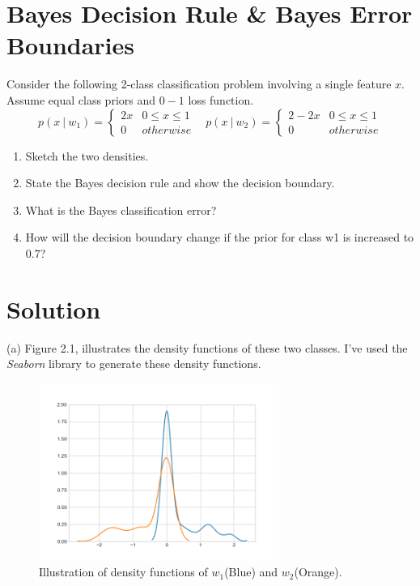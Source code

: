 \documentclass[12pt]{article}
\numberwithin{equation}{section}
\numberwithin{table}{section}
\numberwithin{figure}{section}
\begin{document}
\section{Bayes Decision Rule \& Bayes Error Boundaries}
Consider the following 2-class classification problem involving a single feature $x$. Assume equal class priors and $0-1$ loss function.
$$
p(x\ |\ w_1) = \begin{cases} 
2x &  0 \leq x \leq 1\\
0       &  otherwise
\end{cases} \ \ \ \ p(x\ |\ w_2) = \begin{cases} 
2-2x &  0 \leq x \leq 1\\
0       &  otherwise
\end{cases}
$$	
\begin{enumerate}[label=(\alph*)]
	\item Sketch the two densities.
	
	\item State the Bayes decision rule and show the decision boundary.
	
	\item What is the Bayes classification error?
	
	\item How will the decision boundary change if the prior for class w1 is increased to 0.7? 
\end{enumerate}
\section*{Solution}
(a) Figure 2.1, illustrates the density functions of these two classes. I've used the \textit{Seaborn} library to generate these density functions.
\begin{figure}[!h]\centering
	\includegraphics[width=0.7\textwidth]{2_1_1.png}
	\caption{Illustration of density functions of $w_1$(Blue) and $w_2$(Orange).}
	\label{density}
\end{figure}
\end{document}
